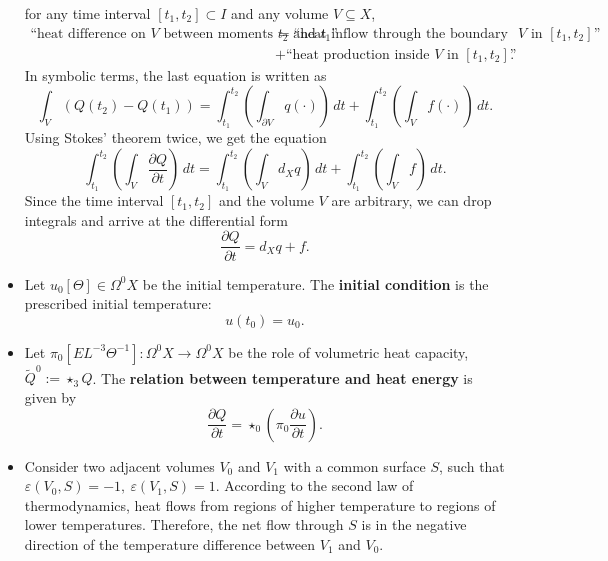 \begin{discussion}
\begin{itemize}
      for any time interval $[t_1, t_2] \subset I$
      and any volume $V \subseteq X$,
      \begin{equation}
        \begin{split}
        \text{``heat difference on $V$ between moments $t_2$ and $t_1$''}
        & =
          \text{``heat inflow through the boundary of $V$ in $[t_1, t_2]$''} \\
        & +
          \text{``heat production inside $V$ in $[t_1, t_2]$''}.
        \end{split}
      \end{equation}
      In symbolic terms, the last equation is written as
      \begin{equation}
        \int_V (Q(t_2) - Q(t_1)) =
          \int_{t_1}^{t_2} \left(\int_{\partial V} q(\cdot) \right)\, d t
        + \int_{t_1}^{t_2} \left(\int_V f(\cdot) \right)\, d t.
      \end{equation}
      Using Stokes' theorem twice, we get the equation
      \begin{equation}
        \int_{t_1}^{t_2}
          \left(\int_V \frac{\partial Q}{\partial t}\right)\, d t =
          \int_{t_1}^{t_2} \left(\int_V d_X q \right)\, d t
        + \int_{t_1}^{t_2} \left(\int_V f \right)\, d t.
      \end{equation}
      Since the time interval $[t_1, t_2]$ and the volume $V$ are arbitrary,
      we can drop integrals and arrive at the differential form
      \begin{equation}
        \frac{\partial Q}{\partial t} = d_X q + f.
      \end{equation}
    \item
      Let
        $u_0 [\Theta] \in \Omega^0 X$ be the initial temperature.
      The \textbf{initial condition} is the prescribed initial temperature:
      \begin{equation}
        u(t_0) = u_0.
      \end{equation}
    \item
      Let $\pi_0 [E L^{-3} \Theta^{-1}] \colon \Omega^0 X \to \Omega^0 X$
      be the role of volumetric heat capacity,
      $\tilde{Q}^0 := \star_3 Q$.
      The \textbf{relation between temperature and heat energy} is given by
      \begin{equation}
        \frac{\partial Q}{\partial t}
        = \star_0 \left(\pi_0 \frac{\partial u}{\partial t}\right).
      \end{equation}
    \item
      Consider two adjacent volumes $V_0$ and $V_1$ with a common surface $S$,
      such that $\varepsilon(V_0, S) = -1,\ \varepsilon(V_1, S) = 1$.
      According to the second law of thermodynamics, heat flows from regions of
      higher temperature to regions of lower temperatures.
      Therefore, the net flow through $S$ is in the negative direction of the
      temperature difference between $V_1$ and $V_0$.
      

\end{itemize}
\end{discussion}
